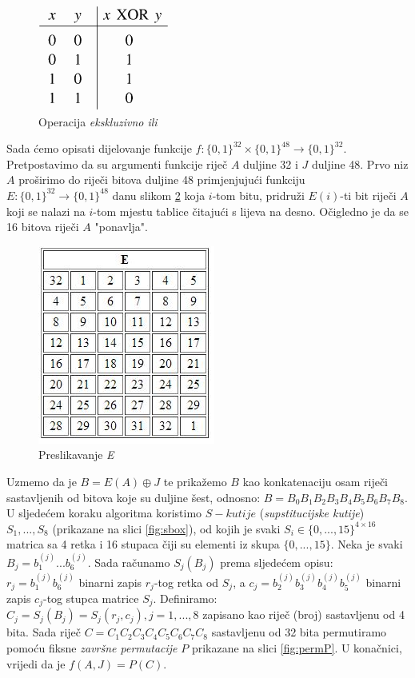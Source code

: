 \documentclass[a4paper,oneside,12pt]{memoir} %
\begin{document}
\begin{spacing}{1.5}
\begin{figure}[h]
\centering \includegraphics[scale=0.8]{XOR.png}
\caption{Operacija \textit{ekskluzivno ili}}
\label{fig:XOR}
\end{figure}
Sada ćemo opisati dijelovanje funkcije $f:\{0,1\}^{32} \times \{0,1\}^{48} \to \{0,1\}^{32}$. Pretpostavimo da su argumenti funkcije riječ $A$ duljine 32 i $J$ duljine 48.
Prvo niz $A$ proširimo do riječi bitova duljine 48 primjenjujući funkciju $E:\{0,1\}^{32} \to \{0,1\}^{48}$ danu slikom \ref{fig:fjaE} koja $i$-tom bitu, pridruži $E(i)$-ti bit riječi $A$ koji se nalazi na $i$-tom mjestu tablice čitajući s lijeva na desno. Očigledno je da se 16 bitova riječi $A$ "ponavlja".
\begin{figure}[h]
\centering \includegraphics[scale=1]{E.jpg}
\caption{Preslikavanje \textit{E}}
\label{fig:fjaE}
\end{figure}
Uzmemo da je $B=E(A)\oplus J$ te prikažemo $B$ kao konkatenaciju osam riječi sastavljenih od bitova koje su duljine šest, odnosno: $B=B_0B_1B_2B_3B_4B_5B_6B_7B_8$. U sljedećem koraku algoritma koristimo $S-kutije$ (\textit{supstitucijske kutije}) $S_1, ..., S_8$ (prikazane na slici \ref{fig:sbox}), od kojih je svaki $S_i \in \{0,...,15\}^{4\times 16}$ matrica sa 4 retka i 16 stupaca čiji su elementi iz skupa $\{0,...,15\}$. Neka je svaki $B_j=b_1^{(j)}...b_6^{(j)}$. Sada računamo $S_j(B_j)$ prema sljedećem opisu:\\$r_j=b_1^{(j)}b_6^{(j)}$ binarni zapis $r_j$-tog retka od $S_j$, a $c_j=b_2^{(j)}b_3^{(j)}b_4^{(j)}b_5^{(j)}$ binarni zapis $c_j$-tog stupca matrice $S_j$. Definiramo: $C_j=S_j(B_j)=S_j(r_j, c_j), j=1,...,8$ zapisano kao riječ (broj) sastavljenu od 4 bita. Sada riječ $C=C_1C_2C_3C_4C_5C_6C_7C_8$ sastavljenu od 32 bita permutiramo pomoću fiksne \textit{završne permutacije} $P$ prikazane na slici \ref{fig:permP}. U konačnici, vrijedi da je $f(A,J)=P(C)$.	

\end{spacing}
\end{document}

